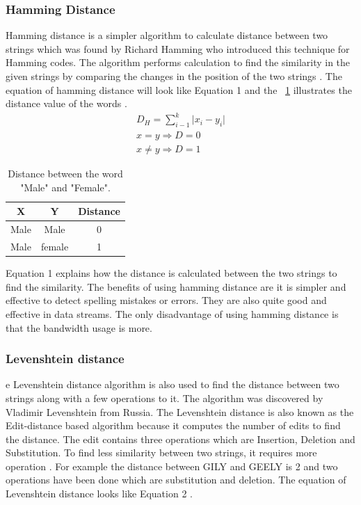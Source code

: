 \subsubsection{Hamming Distance}
Hamming distance is a simpler algorithm to calculate distance between two strings which was found by Richard Hamming who introduced this technique for Hamming codes. The algorithm performs  calculation to find the similarity in the given strings by comparing the changes in the position of the two strings \cite{Tok2015}. The equation of hamming distance will look like Equation 1 and the ~\ref{tab:hammingTable} illustrates the distance value of the words \cite{Saed2021}.
\begin{equation}
	\label{eq:hamming}
	\begin{aligned}	
	{D_H} = \sum_{i-1}^{k} \vert {x_i} - {y_i}\vert \\
	x = y\Rightarrow D = 0 \\
	x \neq y\Rightarrow D = 1
	\end{aligned}
\end{equation}

\begin{table}[h!]
	\begin{center}
		\begin{tabular}{ |c|c|c| } 
			\hline
			X & Y & Distance \\
			\hline
			Male & Male & 0 \\ 
			Male & female & 1 \\ 
			\hline
		\end{tabular}
		\caption{Distance between the word "Male" and "Female".}\label{tab:hammingTable}
	\end{center} 
\end{table} 

Equation 1 explains how the distance is calculated between the two strings to find the similarity. The benefits of using hamming distance are it is simpler and effective to detect spelling mistakes or errors. They are also quite good and effective in data streams. The only disadvantage of using hamming distance is that the bandwidth usage is more.
\subsubsection{Levenshtein distance}
e Levenshtein distance algorithm is also used to find the distance between two strings along with a few operations to it. The algorithm was discovered by Vladimir Levenshtein from Russia. The Levenshtein distance is also known as the Edit-distance based algorithm because it computes the number of edits to find the distance. The edit contains three operations which are Insertion, Deletion and Substitution. To find less similarity between two strings, it requires more operation \cite{ChSa2019}. For example the distance between GILY and GEELY is 2 and two operations have been done which are substitution and deletion. The equation of Levenshtein distance looks like Equation 2 \cite{Cuelogic}.

